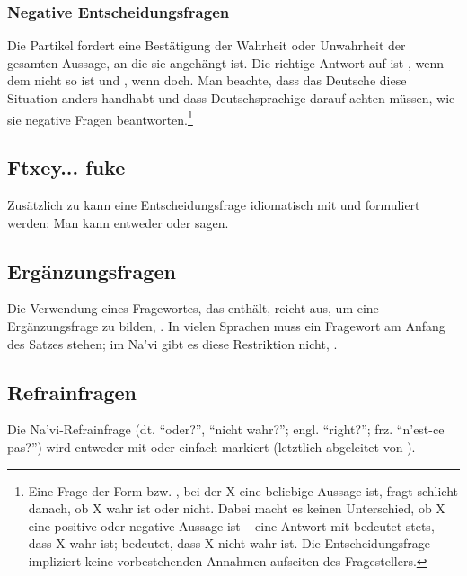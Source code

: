 \subsubsection{Negative Entscheidungsfragen} 
Die Partikel  fordert eine Bestätigung der Wahrheit oder Unwahrheit der gesamten Aussage, an die sie angehängt ist. Die richtige Antwort auf   ist , wenn dem nicht so ist und , wenn doch. Man beachte, dass das Deutsche diese Situation anders handhabt und dass Deutschsprachige darauf achten müssen, wie sie negative Fragen beantworten.\footnote{Eine Frage der Form  bzw. , bei der X eine beliebige Aussage ist, fragt schlicht danach, ob X wahr ist oder nicht. Dabei macht es keinen Unterschied, ob X eine positive oder negative Aussage ist -- eine Antwort mit  bedeutet stets, dass X wahr ist;  bedeutet, dass X nicht wahr ist. Die Entscheidungsfrage impliziert keine vorbestehenden Annahmen aufseiten des Fragestellers.} 

\subsection{Ftxey... fuke} Zusätzlich zu  kann eine Entscheidungsfrage idiomatisch mit   und   formuliert werden: Man kann entweder   oder   sagen.
\label{syn:question:ftxey}

\subsection{Ergänzungsfragen} Die Verwendung eines Fragewortes, das  enthält, reicht aus, um eine Ergänzungsfrage zu bilden,  . In vielen Sprachen muss ein Fragewort am Anfang des Satzes stehen; im Na'vi gibt es diese Restriktion nicht,  .

\subsection{Refrainfragen} Die Na'vi-Refrainfrage (dt. ``oder?'', ``nicht wahr?''; engl. ``right?''; frz. ``n'est-ce pas?'') wird entweder mit  oder einfach  markiert (letztlich abgeleitet von  ).

